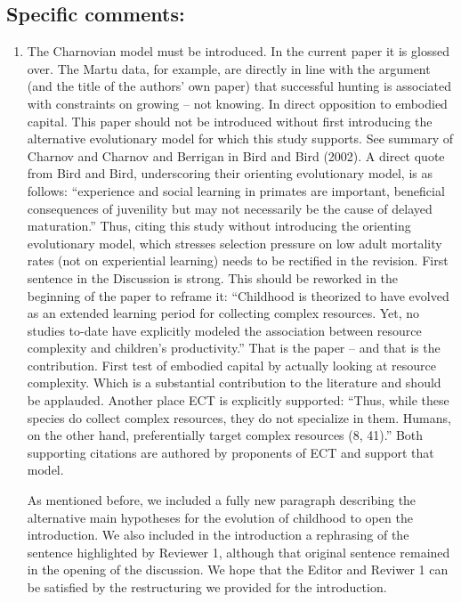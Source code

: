 \documentclass{article}
\newcommand{\rev}[1]{{\color{ForestGreen}#1}}
\begin{document}
\subsection{Specific comments:}
\begin{enumerate}
    \item The Charnovian model must be introduced. In the current paper it is glossed over. The Martu data, for example, are directly in line with the argument (and the title of the authors’ own paper) that successful hunting is associated with constraints on growing – not knowing. In direct opposition to embodied capital. This paper should not be introduced without first introducing the alternative evolutionary model for which this study supports. See summary of Charnov and Charnov and Berrigan in Bird and Bird (2002). A direct quote from Bird and Bird, underscoring their orienting evolutionary model, is as follows: “experience and social learning in primates are important, beneficial consequences of juvenility but may not necessarily be the cause of delayed maturation.” Thus, citing this study without introducing the orienting evolutionary model, which stresses selection pressure on low adult mortality rates (not on experiential learning) needs to be rectified in the revision. First sentence in the Discussion is strong. This should be reworked in the beginning of the paper to reframe it: “Childhood is theorized to have evolved as an extended learning period for collecting complex resources. Yet, no studies to-date have explicitly modeled the association between resource complexity and children’s productivity.” That is the paper – and that is the contribution. First test of embodied capital by actually looking at resource complexity. Which is a substantial contribution to the literature and should be applauded. Another place ECT is explicitly supported: “Thus, while these species do collect complex resources, they do not specialize in them. Humans, on the other hand, preferentially target complex resources (8, 41).” Both supporting citations are authored by proponents of ECT and support that model.
    
\rev{As mentioned before, we included a fully new paragraph describing the alternative main hypotheses for the evolution of childhood to open the introduction. We also included in the introduction a rephrasing of the sentence highlighted by Reviewer 1, although that original sentence remained in the opening of the discussion. We hope that the Editor and Reviwer 1 can be satisfied by the restructuring we provided for the introduction.}


\end{enumerate}
\end{document}
